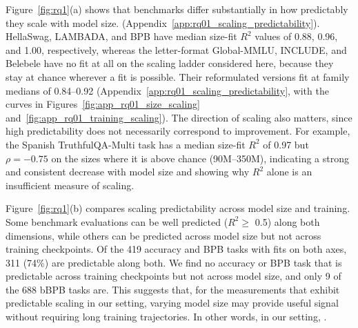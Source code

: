 Figure~\ref{fig:rq1}(a) shows that benchmarks differ substantially in how predictably they scale with model size.  (Appendix~\ref{app:rq01_scaling_predictability}). HellaSwag, LAMBADA, and BPB have median size-fit $R^2$ values of 0.88, 0.96, and 1.00, respectively, whereas the letter-format Global-MMLU, INCLUDE, and Belebele have no fit at all on the scaling ladder considered here, because they stay at chance wherever a fit is possible. Their reformulated versions fit at family medians of 0.84--0.92 (Appendix~\ref{app:rq01_scaling_predictability}, with the curves in Figures~\ref{fig:app_rq01_size_scaling} and~\ref{fig:app_rq01_training_scaling}). The direction of scaling also matters, since high predictability does not necessarily correspond to improvement. For example, the Spanish TruthfulQA-Multi task has a median size-fit $R^2$ of 0.97 but $\rho=-0.75$ on the sizes where it is above chance (90M--350M), indicating a strong and consistent decrease with model size and showing why $R^2$ alone is an insufficient measure of scaling.

Figure~\ref{fig:rq1}(b) compares scaling predictability across model size and training. Some benchmark evaluations can be well predicted ($R^2 \geq$ 0.5) along both dimensions, while others can be predicted across model size but not across training checkpoints. Of the 419 accuracy and BPB tasks with fits on both axes, 311 (74\%) are predictable along both. We find no accuracy or BPB task that is predictable across training checkpoints but not across model size, and only 9 of the 688 bBPB tasks are.
This suggests that, for the measurements that exhibit predictable scaling in our setting, varying model size may provide useful signal without requiring long training trajectories.
In other words, in our setting, .

